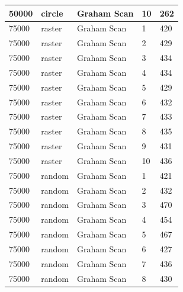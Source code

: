 \documentclass[12pt]{article}
\begin{document}
\begin{longtable}{|l|l|l|l|l|}
50000        & circle            & Graham Scan & 10         & 262                           \\ \hline
75000        & raster            & Graham Scan & 1          & 420                           \\ \hline
75000        & raster            & Graham Scan & 2          & 429                           \\ \hline
75000        & raster            & Graham Scan & 3          & 434                           \\ \hline
75000        & raster            & Graham Scan & 4          & 434                           \\ \hline
75000        & raster            & Graham Scan & 5          & 429                           \\ \hline
75000        & raster            & Graham Scan & 6          & 432                           \\ \hline
75000        & raster            & Graham Scan & 7          & 433                           \\ \hline
75000        & raster            & Graham Scan & 8          & 435                           \\ \hline
75000        & raster            & Graham Scan & 9          & 431                           \\ \hline
75000        & raster            & Graham Scan & 10         & 436                           \\ \hline
75000        & random            & Graham Scan & 1          & 421                           \\ \hline
75000        & random            & Graham Scan & 2          & 432                           \\ \hline
75000        & random            & Graham Scan & 3          & 470                           \\ \hline
75000        & random            & Graham Scan & 4          & 454                           \\ \hline
75000        & random            & Graham Scan & 5          & 467                           \\ \hline
75000        & random            & Graham Scan & 6          & 427                           \\ \hline
75000        & random            & Graham Scan & 7          & 436                           \\ \hline
75000        & random            & Graham Scan & 8          & 430                           \\ \hline

\end{longtable}
\end{document}
